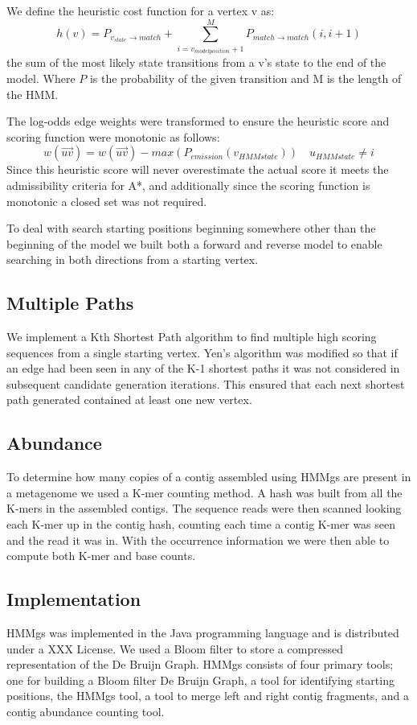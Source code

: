 \documentclass[10pt]{bmc_article}
\newenvironment{bmcformat}{\begin{raggedright}\baselineskip20pt\sloppy\setboolean{publ}{false}}{\end{raggedright}\baselineskip20pt\sloppy}
\begin{document}
\begin{bmcformat}
We define the heuristic cost function for a vertex v as:
\[h(v) = P_{v_{state}\rightarrow match} + \sum_{i=v_{model position} + 1}^{M}P_{match\rightarrow match}(i, i + 1)\]
the sum of the most likely state transitions from a v's state to the end of the model. Where $P$ is the probability of the given transition and M is the length of the HMM.

The log-odds edge weights were transformed to ensure the heuristic score and scoring function were monotonic as follows:
\[ w(\overrightarrow{uv}) = w(\overrightarrow{uv}) - max(P_{emission}(v_{HMM state})) \quad u_{HMM state} \ne i\]
Since this heuristic score will never overestimate the actual score it meets the admissibility criteria for A*, and additionally since the scoring function is monotonic a closed set was not required.

To deal with search starting positions beginning somewhere other than the beginning of the model we built both a forward and reverse model to enable searching in both directions from a starting vertex.

\subsection*{Multiple Paths}

We implement a Kth Shortest Path algorithm\cite{Yen1971}\cite{Lawler1972} to find multiple high scoring sequences from a single starting vertex.  Yen's algorithm was modified so that if an edge had been seen in any of the K-1 shortest paths it was not considered in subsequent candidate generation iterations.  This ensured that each next shortest path generated contained at least one new vertex.

\subsection*{Abundance}
To determine how many copies of a contig assembled using HMMgs are present in a metagenome we used a K-mer counting method.  A hash was built from all the K-mers in the assembled contigs. The sequence reads were then scanned looking each K-mer up in the contig hash, counting each time a contig K-mer was seen and the read it was in. With the occurrence information we were then able to compute both K-mer and base counts.

\subsection*{Implementation}
HMMgs was implemented in the Java programming language and is distributed under a XXX License.  We used a Bloom filter to store a compressed representation of the De Bruijn Graph. HMMgs consists of four primary tools; one for building a Bloom filter De Bruijn Graph, a tool for identifying starting positions, the HMMgs tool, a tool to merge left and right contig fragments, and a contig abundance counting tool.


\end{bmcformat}
\end{document}
